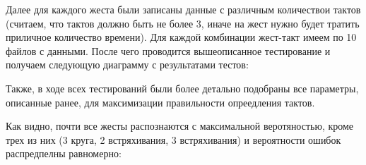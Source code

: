 Далее для каждого жеста были записаны данные с различным количествои тактов (считаем, что тактов должно быть не более 3, иначе на жест нужно будет тратить приличное количество времени). Для каждой комбинации жест-такт имеем по 10 файлов с данными. После чего проводится вышеописанное тестирование и получаем следующую диаграмму с результатами тестов: \\

\begin{figure}[H]
\end{figure}

Также, в ходе всех тестирований были более детально подобраны все параметры, описанные ранее, для максимизации правильности опреедления тактов.

Как видно, почти все жесты распознаются с максимальной веротяностью, кроме трех из них (3 круга, 2 встряхивания, 3 встряхивания) и вероятности ошибок распредпелны равномерно:

\begin{figure}[H]
\end{figure}

